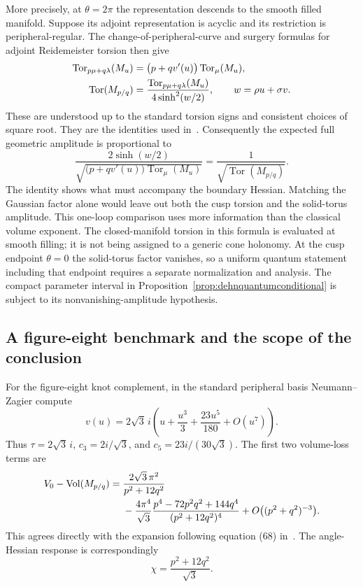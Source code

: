 \documentclass[11pt,a4paper]{article}
\numberwithin{equation}{section}
\theoremstyle{definition}
\theoremstyle{remark}
\DeclareMathOperator{\Vol}{Vol}
\begin{document}
More precisely, at $\theta=2\pi$ the representation descends to the
smooth filled manifold. Suppose its adjoint representation is acyclic
and its restriction is peripheral-regular. The change-of-peripheral-curve
and surgery formulas for adjoint Reidemeister torsion then give
\begin{align}
 \operatorname{Tor}_{p\mu+q\lambda}(M_u)
   &=\bigl(p+qv'(u)\bigr)\operatorname{Tor}_\mu(M_u),\notag\\
 \operatorname{Tor}(M_{p/q})
   &=\frac{\operatorname{Tor}_{p\mu+q\lambda}(M_u)}
               {4\sinh^2(w/2)},\qquad
 w=\rho u+\sigma v.
 \label{eq:dehntorsionsurgery}
\end{align}
These are understood up to the standard torsion signs and
consistent choices of square root. They are the identities
used in~\cite[equations (5.16) and (5.23)]{WongYangDehn}.
Consequently the expected full geometric amplitude is proportional to
\begin{equation}
 \boxed{
 \frac{2\sinh(w/2)}
      {\sqrt{\bigl(p+qv'(u)\bigr)\operatorname{Tor}_\mu(M_u)}}
       =\frac{1}{\sqrt{\operatorname{Tor}(M_{p/q})}}.}
 \label{eq:dehngaussiantorsion}
\end{equation}
The identity shows what must accompany the boundary Hessian.
Matching the Gaussian factor alone would leave out both the cusp
torsion and the solid-torus amplitude. This one-loop comparison
uses more information than the classical volume exponent.
The closed-manifold torsion in this formula is evaluated at smooth
filling; it is not being assigned to a generic cone holonomy.
At the cusp endpoint $\theta=0$ the solid-torus factor vanishes,
so a uniform quantum statement including that endpoint requires
a separate normalization and analysis. The compact parameter
interval in Proposition~\ref{prop:dehnquantumconditional} is
subject to its nonvanishing-amplitude hypothesis.

\subsection{A figure-eight benchmark and the scope of the conclusion}

For the figure-eight knot complement, in the standard peripheral
basis Neumann--Zagier compute
\begin{equation}
 v(u)=2\sqrt3\,i\left(u+\frac{u^3}{3}
                    +\frac{23u^5}{180}+O(u^7)\right).
 \label{eq:figureeightNZcoefficients}
\end{equation}
Thus $\tau=2\sqrt3\,i$, $c_3=2i/\sqrt3$, and
$c_5=23i/(30\sqrt3)$. The first two volume-loss terms are
\begin{align}
 V_0-\Vol(M_{p/q})={}&\frac{2\sqrt3\,\pi^2}{p^2+12q^2}\notag\\
 &-\frac{4\pi^4}{\sqrt3}
  \frac{p^4-72p^2q^2+144q^4}{(p^2+12q^2)^4}
  +O\bigl((p^2+q^2)^{-3}\bigr).
 \label{eq:figureeightfillingloss}
\end{align}
This agrees directly with the expansion following equation (68)
in~\cite{NeumannZagier}. The angle-Hessian response is correspondingly
\[
 \chi=\frac{p^2+12q^2}{\sqrt3}.
\]
\end{document}
